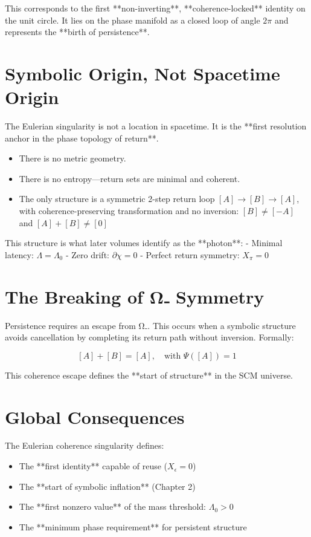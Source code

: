This corresponds to the first **non-inverting**, **coherence-locked** identity on the unit circle. It lies on the phase manifold as a closed loop of angle $2\pi$ and represents the **birth of persistence**.

\section{Symbolic Origin, Not Spacetime Origin}

The Eulerian singularity is not a location in spacetime. It is the **first resolution anchor in the phase topology of return**.

\begin{itemize}
  \item There is no metric geometry.
  \item There is no entropy—return sets are minimal and coherent.
  \item The only structure is a symmetric 2-step return loop $[A] \to [B] \to [A]$, with coherence-preserving transformation and no inversion: $[B] \ne [-A]$ and $[A] + [B] \ne [0]$
\end{itemize}

This structure is what later volumes identify as the **photon**:
- Minimal latency: $\Lambda = \Lambda_0$
- Zero drift: $\partial \chi = 0$
- Perfect return symmetry: $X_\pi = 0$

\section{The Breaking of Ω₋ Symmetry}

Persistence requires an escape from Ω₋. This occurs when a symbolic structure avoids cancellation by completing its return path without inversion. Formally:

\[
[A] + [B] = [A], \quad \text{with } \Psi([A]) = 1
\]

This coherence escape defines the **start of structure** in the SCM universe.

\section{Global Consequences}

The Eulerian coherence singularity defines:

\begin{itemize}
  \item The **first identity** capable of reuse ($X_\epsilon = 0$)
  \item The **start of symbolic inflation** (Chapter 2)
  \item The **first nonzero value** of the mass threshold: $\Lambda_0 > 0$
  \item The **minimum phase requirement** for persistent structure
\end{itemize}

